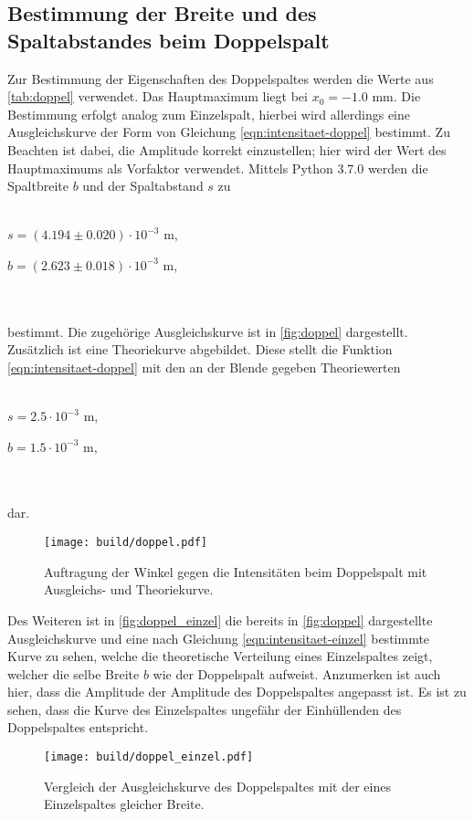 \subsection{Bestimmung der Breite und des Spaltabstandes beim Doppelspalt}
    Zur Bestimmung der Eigenschaften des Doppelspaltes werden die Werte aus \autoref{tab:doppel} verwendet. Das Hauptmaximum liegt bei 
    $x_0 = -1.0$ mm. Die Bestimmung erfolgt analog zum Einzelspalt, hierbei wird allerdings eine Ausgleichskurve der Form von Gleichung \eqref{eqn:intensitaet-doppel}
    bestimmt. Zu Beachten ist dabei, die Amplitude korrekt einzustellen; hier wird der Wert des Hauptmaximums als Vorfaktor verwendet.
    Mittels Python 3.7.0 werden die Spaltbreite $b$ und der Spaltabstand $s$ zu 
    \\ \\
    \centerline{$s = (4.194 \pm 0.020) \cdot 10^{-3} $ m,}
    \centerline{$b = (2.623 \pm 0.018) \cdot 10^{-3}$ m,}
    \\ \\
    bestimmt. Die zugehörige Ausgleichskurve ist in \autoref{fig:doppel} dargestellt. Zusätzlich ist eine Theoriekurve abgebildet. Diese 
    stellt die Funktion \eqref{eqn:intensitaet-doppel} mit den an der Blende gegeben Theoriewerten
     \\ \\
    \centerline{$s = 2.5 \cdot 10^{-3} $ m,}
    \centerline{$b = 1.5 \cdot 10^{-3}$ m,}
    \\ \\
    dar. 
    
    \begin{figure}
        \centering
        \texttt{[image: build/doppel.pdf]}
        \caption{Auftragung der Winkel gegen die Intensitäten beim Doppelspalt mit Ausgleichs- und Theoriekurve.}
        \label{fig:doppel}
    \end{figure}

    
    Des Weiteren ist in \autoref{fig:doppel_einzel} die bereits in \autoref{fig:doppel} dargestellte Ausgleichskurve und eine nach Gleichung
    \eqref{eqn:intensitaet-einzel} bestimmte Kurve zu sehen, welche die theoretische Verteilung eines Einzelspaltes zeigt, welcher die selbe 
    Breite $b$ wie der Doppelspalt aufweist. Anzumerken ist auch hier, dass die Amplitude der Amplitude des Doppelspaltes angepasst ist.
    Es ist zu sehen, dass die Kurve des Einzelspaltes ungefähr der Einhüllenden des Doppelspaltes entspricht.

    \begin{figure}
        \centering
        \texttt{[image: build/doppel\_einzel.pdf]}
        \caption{Vergleich der Ausgleichskurve des Doppelspaltes mit der eines Einzelspaltes gleicher Breite.}
        \label{fig:doppel_einzel}
    \end{figure}


    